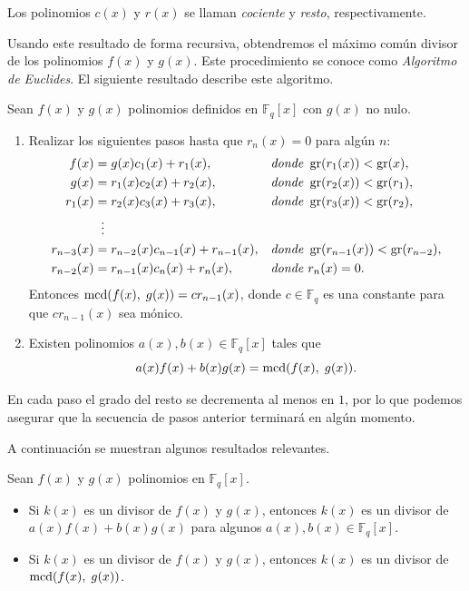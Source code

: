 Los polinomios $c(x)$ y $r(x)$ se llaman \emph{cociente} y \emph{resto}, respectivamente.

Usando este resultado de forma recursiva, obtendremos el máximo común divisor de los polinomios $f(x)$ y $g(x)$. Este procedimiento se conoce como \emph{Algoritmo de Euclides}. El siguiente resultado describe este algoritmo.

\begin{theorem}
    \label{th:alg-euclides}
    Sean $f(x)$ y $g(x)$ polinomios definidos en $\mathbb{F}_q[x]$ con $g(x)$ no nulo.
    \begin{enumerate}
        \item Realizar los siguientes pasos hasta que $r_n(x) = 0$ para algún $n$:
            \begin{align*}
                f(x)        &= g(x) c_1(x) + r_1(x), & &\textit{donde } \operatorname{gr}(r_1(x)) < \operatorname{gr}(x),\\
                g(x)        &= r_1(x) c_2(x) + r_2(x),& &\textit{donde } \operatorname{gr}(r_2(x)) < \operatorname{gr}(r_1),\\
                r_1(x)      &= r_2(x) c_3(x) + r_3(x),& &\textit{donde } \operatorname{gr}(r_3(x)) < \operatorname{gr}(r_2),\\
                            &\; \; \vdots & &\\
                r_{n-3}(x)  &= r_{n-2}(x) c_{n-1}(x) + r_{n-1}(x),& &\textit{donde } \operatorname{gr}(r_{n-1}(x)) < \operatorname{gr}(r_{n-2}),\\
                r_{n-2}(x)  &= r_{n-1}(x) c_{n}(x) + r_{n}(x),& &\textit{donde } r_n(x) = 0.
            \end{align*}
            Entonces $\operatorname{mcd}(f(x), \; g(x)) = cr_{n-1}(x)$, donde $c \in \mathbb{F}_q$ es una constante para que $c r_{n-1}(x)$ sea mónico.
        \item Existen polinomios $a(x), b(x) \in \mathbb{F}_q[x]$ tales que 
        $$a(x) f(x) + b(x) g(x) = \operatorname{mcd}(f(x), \; g(x)).$$
    \end{enumerate}
\end{theorem}

En cada paso el grado del resto se decrementa al menos en $1$, por lo que podemos asegurar que la secuencia de pasos anterior terminará en algún momento.

A continuación se muestran algunos resultados relevantes.

\begin{proposition}
    Sean $f(x)$ y $g(x)$ polinomios en $\mathbb{F}_q[x]$.
    \begin{itemize}
        \item Si $k(x)$ es un divisor de $f(x)$ y $g(x)$, entonces $k(x)$ es un divisor de $a(x) f(x) + b(x) g(x)$ para algunos $a(x), b(x) \in \mathbb{F}_q[x]$.
        \item Si $k(x)$ es un divisor de $f(x)$ y $g(x)$, entonces $k(x)$ es un divisor de $\operatorname{mcd}(f(x), \; g(x))$.
    \end{itemize}
\end{proposition}

